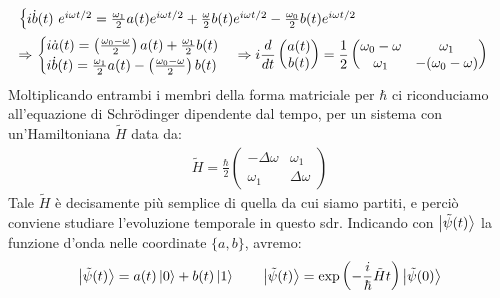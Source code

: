 \documentclass[../../InformazioneQuantistica.tex]{subfiles}
\begin{document}
\begin{enumerate}
\begin{align*}
\begin{cases}
i\dot{b}(t)\ e^{i\omega t/2} = \frac{\omega_1}{2}a(t) e^{i\omega t/2} + \frac{\omega}{2}b(t) e^{i\omega t/2} -\frac{\omega_0}{2} b(t) e^{i\omega t/2}
\end{cases}\\
\Rightarrow \begin{cases}
i \dot{a}(t) = \left(\frac{\omega_0-\omega}{2}\right) a(t) + \frac{\omega_1}{2}b(t)\\
i\dot{b}(t) = \frac{\omega_1}{2}a(t) - \left(\frac{\omega_0 -\omega}{2}\right) b(t)
\end{cases}\Rightarrow i \frac{d}{dt}\begin{pmatrix}
a(t)\\b(t)\end{pmatrix}=\frac{1}{2}\begin{pmatrix}
\omega_0-\omega & \omega_1\\
\omega_1 & - (\omega_0-\omega)
\end{pmatrix}
\span
\end{align*}
Moltiplicando entrambi i membri della forma matriciale per $\hbar$ ci riconduciamo all'equazione di Schr\"odinger dipendente dal tempo, per un sistema con un'Hamiltoniana $\tilde{H}$ data da:
\begin{align}
\tilde{H} = \frac{\hbar}{2}\begin{pmatrix}
-\Delta \omega & \omega_1\\
\omega_1 & \Delta \omega \end{pmatrix}
\label{eqn:H-tilda}
\end{align}
Tale $\tilde{H}$ è decisamente più semplice di quella da cui siamo partiti, e perciò conviene studiare l'evoluzione temporale in questo sdr. Indicando con $\Ket{\tilde{\psi}(t)}$ la funzione d'onda nelle coordinate $\{a,b\}$, avremo:
\begin{align*}
\Ket{\tilde{\psi}(t)} = a(t) \Ket{0} + b(t) \Ket{1} \qquad \Ket{\tilde{\psi}(t)} = \exp\left(-\frac{i}{\hbar}\tilde{H}t\right)\Ket{\tilde{\psi}(0)}
\end{align*}


\end{enumerate}
\end{document}
